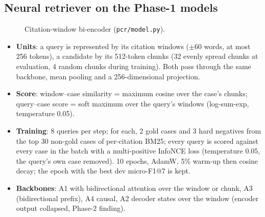 \documentclass[11pt,a4paper]{article}
\newcommand{\code}[1]{\texttt{\small #1}}
\begin{document}
\subsection{Neural retriever on the Phase-1 models}
\begin{figure}[H]\centering
{}
\caption{Citation-window bi-encoder (\code{pcr/model.py}).}
\label{fig:model}\end{figure}
\begin{itemize}
  \item \textbf{Units}: a query is represented by its citation windows ($\pm60$ words, at most 256 tokens), a
  candidate by its 512-token chunks (32 evenly spread chunks at evaluation, 4 random chunks during training).
  Both pass through the same backbone, mean pooling and a 256-dimensional projection.
  \item \textbf{Score}: window--case similarity = maximum cosine over the case's chunks; query--case score =
  soft maximum over the query's windows (log-sum-exp, temperature 0.05).
  \item \textbf{Training}: 8 queries per step; for each, 2 gold cases and 3 hard negatives from the top 30
  non-gold cases of per-citation BM25; every query is scored against every case in the batch with a
  multi-positive InfoNCE loss \cite{oord2018cpc} (temperature 0.05, the query's own case removed).  10 epochs,
  AdamW, 5\% warm-up then cosine decay; the epoch with the best dev micro-F1@7 is kept.
  \item \textbf{Backbones}: A1 with bidirectional attention over the window or chunk, A3 (bidirectional prefix),
  A4 causal, A2 decoder states over the window (encoder output collapsed, Phase-2 finding).
\end{itemize}
\end{document}
